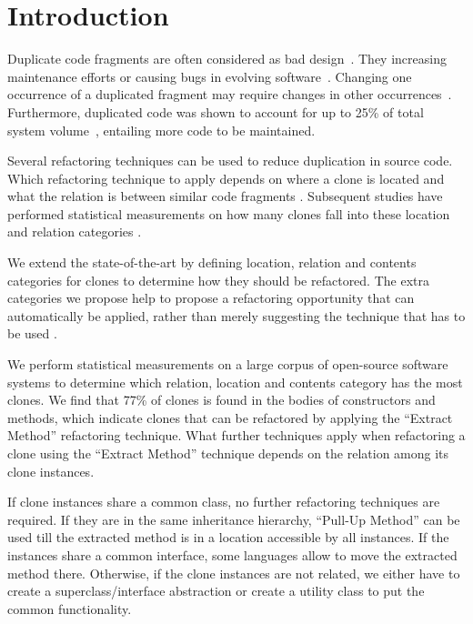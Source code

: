 \documentclass[runningheads]{llncs}
\begin{document}
\section{Introduction}
Duplicate code fragments are often considered as bad design~\cite{fowler2018refactoring}. They increasing maintenance efforts or causing bugs in evolving software~\cite{heitlager2007practical}. Changing one occurrence of a duplicated fragment may require changes in other occurrences~\cite{ostberg2014automatically}. Furthermore, duplicated code was shown to account for up to 25\% of total system volume~\cite{bruntink2005use}, entailing more code to be maintained.

Several refactoring techniques can be used to reduce duplication in source code. Which refactoring technique to apply depends on where a clone is located and what the relation is between similar code fragments \cite{koni2001scenario}. Subsequent studies have performed statistical measurements on how many clones fall into these location and relation categories \cite{fontana2012duplicated, fontana2015duplicated}.

We extend the state-of-the-art \cite{fontana2015duplicated} by defining location, relation and contents categories for clones to determine how they should be refactored. The extra categories we propose help to propose a refactoring opportunity that can automatically be applied, rather than merely suggesting the technique that has to be used \cite{fontana2015duplicated}.

We perform statistical measurements on a large corpus of open-source software systems to determine which relation, location and contents category has the most clones. We find that 77\% of clones is found in the bodies of constructors and methods, which indicate clones that can be refactored by applying the ``Extract Method'' refactoring technique. What further techniques apply when refactoring a clone using the ``Extract Method'' technique depends on the relation among its clone instances.

If clone instances share a common class, no further refactoring techniques are required. If they are in the same inheritance hierarchy, ``Pull-Up Method'' can be used till the extracted method is in a location accessible by all instances. If the instances share a common interface, some languages allow to move the extracted method there. Otherwise, if the clone instances are not related, we either have to create a superclass/interface abstraction or create a utility class to put the common functionality.
\end{document}
